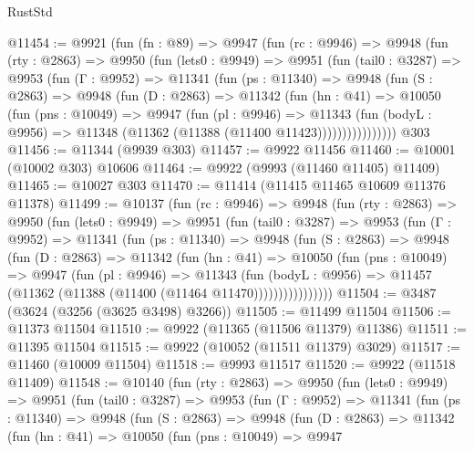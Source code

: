 \begin{lexlean}{RustStd}
\begin{coremodule}
@11454 := @9921
    (fun (fn : @89) =>
    @9947
      (fun (rc : @9946) =>
      @9948
        (fun (rty : @2863) =>
        @9950
          (fun (lets0 : @9949) =>
          @9951
            (fun (tail0 : @3287) =>
            @9953
              (fun (Γ : @9952) =>
              @11341
                (fun (ps : @11340) =>
                @9948
                  (fun (S : @2863) =>
                  @9948
                    (fun (D : @2863) =>
                    @11342
                      (fun (hn : @41) =>
                      @10050
                        (fun (pns : @10049) =>
                        @9947
                          (fun (pl : @9946) =>
                          @11343
                            (fun (bodyL : @9956) =>
                            @11348 (@11362 (@11388 (@11400 @11423))))))))))))))))
    @303
@11456 := @11344 (@9939 @303)
@11457 := @9922 @11456
@11460 := @10001 (@10002 @303) @10606
@11464 := @9922 (@9993 (@11460 @11405) @11409)
@11465 := @10027 @303
@11470 := @11414 (@11415 @11465 @10609 @11376 @11378)
@11499 := @10137
    (fun (rc : @9946) =>
    @9948
      (fun (rty : @2863) =>
      @9950
        (fun (lets0 : @9949) =>
        @9951
          (fun (tail0 : @3287) =>
          @9953
            (fun (Γ : @9952) =>
            @11341
              (fun (ps : @11340) =>
              @9948
                (fun (S : @2863) =>
                @9948
                  (fun (D : @2863) =>
                  @11342
                    (fun (hn : @41) =>
                    @10050
                      (fun (pns : @10049) =>
                      @9947
                        (fun (pl : @9946) =>
                        @11343
                          (fun (bodyL : @9956) =>
                          @11457 (@11362 (@11388 (@11400 (@11464 @11470))))))))))))))))
@11504 := @3487 (@3624 (@3256 (@3625 @3498) @3266))
@11505 := @11499 @11504
@11506 := @11373 @11504
@11510 := @9922 (@11365 (@11506 @11379) @11386)
@11511 := @11395 @11504
@11515 := @9922 (@10052 (@11511 @11379) @3029)
@11517 := @11460 (@10009 @11504)
@11518 := @9993 @11517
@11520 := @9922 (@11518 @11409)
@11548 := @10140
    (fun (rty : @2863) =>
    @9950
      (fun (lets0 : @9949) =>
      @9951
        (fun (tail0 : @3287) =>
        @9953
          (fun (Γ : @9952) =>
          @11341
            (fun (ps : @11340) =>
            @9948
              (fun (S : @2863) =>
              @9948
                (fun (D : @2863) =>
                @11342
                  (fun (hn : @41) =>
                  @10050
                    (fun (pns : @10049) =>
                    @9947

\end{coremodule}
\end{lexlean}
